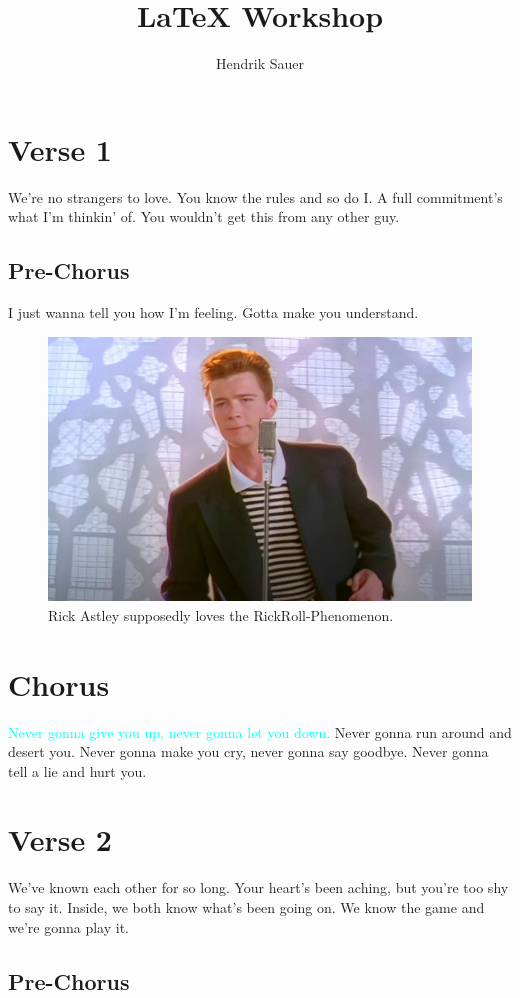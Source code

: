 \documentclass{article}
\title{\LaTeX{} Workshop}
\author{Hendrik Sauer }
\begin{document}
\maketitle

\section{Verse 1}

We're no strangers to love.
You know the rules and so do I.
A full commitment's what I'm thinkin' of.
You wouldn't get this from any other guy.

\subsection{Pre-Chorus}

I just wanna tell you how I'm feeling.
Gotta make you understand.

\begin{figure}
    \centering
    \includegraphics[width=0.5\linewidth]{rick-astley.jpg}
    \caption{Rick Astley supposedly loves the RickRoll-Phenomenon.}
    \label{fig:rick-astley}
\end{figure}

\section{Chorus}

\textcolor{cyan}{Never gonna give you up, never gonna let you down.}
Never gonna run around and desert you.
Never gonna make you cry, never gonna say goodbye.
Never gonna tell a lie and hurt you.

\section{Verse 2}

We've known each other for so long.
Your heart's been aching, but you're too shy to say it.
Inside, we both know what's been going on.
We know the game and we're gonna play it.


\subsection{Pre-Chorus}
\end{document}
